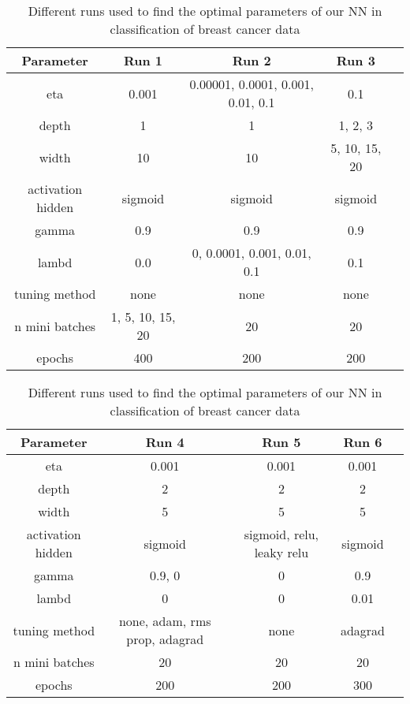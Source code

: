 \begin{table}[H]
    \centering
    \caption{Different runs used to find the optimal parameters of our NN in
    classification of breast cancer data}  
    \label{tab:runs_classification_cancer} 
    \begin{tabular}{|c|c|c|c|c|}
        \hline

        Parameter & Run 1 & Run 2 & Run 3 \\
        \hline
        eta & 0.001 & 0.00001, 0.0001, 0.001, 0.01, 0.1 & 0.1 \\
        \hline
        depth & 1  & 1  & 1, 2, 3 \\
        \hline
        width & 10   & 10 & 5, 10, 15, 20\\
        \hline
        activation hidden & sigmoid & sigmoid & sigmoid\\
        \hline
        gamma & 0.9 & 0.9 & 0.9\\
        \hline
        lambd & 0.0  & 0, 0.0001, 0.001, 0.01, 0.1 & 0.1\\
        \hline
        tuning method & none & none  & none\\
        \hline
        n mini batches & 1, 5, 10, 15, 20  & 20 & 20\\
        \hline
        epochs & 400  & 200 & 200\\
        \hline
         
    \end{tabular} 
\end{table}

\begin{table}[H]
    \centering
    \caption{Different runs used to find the optimal parameters of our NN in
    classification of breast cancer data}  
    \label{tab:runs_classification_cancer2} 
    \begin{tabular}{|c|c|c|c|c|}
        \hline

        Parameter & Run 4 & Run 5 & Run 6\\
        \hline
        eta & 0.001 & 0.001 & 0.001\\
        \hline
        depth & 2  & 2 & 2\\
        \hline
        width & 5   & 5 & 5\\
        \hline
        activation hidden & sigmoid & sigmoid, relu, leaky relu & sigmoid\\
        \hline
        gamma & 0.9, 0 & 0 & 0.9\\
        \hline
        lambd & 0  & 0 & 0.01\\
        \hline
        tuning method & none, adam, rms prop, adagrad  & none & adagrad\\
        \hline
        n mini batches & 20  & 20 & 20\\
        \hline
        epochs & 200  & 200 & 300\\
        \hline
         
    \end{tabular} 
\end{table}



